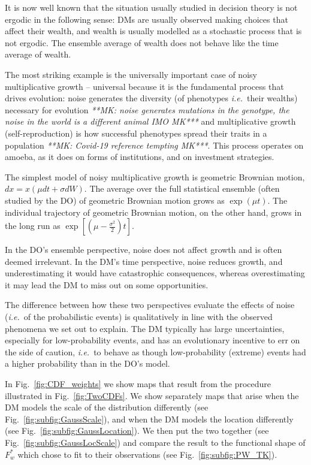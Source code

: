 \documentclass[a4paper, 12pt]{article}
\newcommand{\fref}[1]{Fig.~\ref{fig:#1}}
\newcommand{\ie}{{\it i.e.}\ }
\newcommand{\MK}[1]{{\it ***MK: #1 MK***}}
\begin{document}
It is now well known that the situation usually studied in decision theory is not ergodic in the following sense: DMs are usually observed making choices that affect their wealth, and wealth is usually modelled as a stochastic process that is not ergodic. The ensemble average of wealth does not behave like the time average of wealth.

The most striking example is the universally important case of noisy multiplicative growth -- universal because it is the fundamental process that drives evolution: noise generates the diversity (of phenotypes \ie their wealths) necessary for evolution \MK{noise generates mutations in the genotype, the noise in the world is a different animal IMO} and multiplicative growth (self-reproduction) is how successful phenotypes spread their traits in a population \MK{Covid-19 reference tempting}. This process operates on amoeba, as it does on forms of institutions, and on investment strategies.\cite{PetersAdamou2015a}

The simplest model of noisy multiplicative growth is geometric Brownian motion, $dx=x(\mu dt+\sigma dW)$. The average over the full statistical ensemble (often studied by the DO) of geometric Brownian motion grows as $\exp(\mu t)$. The individual trajectory of geometric Brownian motion, on the other hand, grows in the long run as $\exp[(\mu-\frac{\sigma^2}{2})t]$.

In the DO's ensemble perspective, noise does not affect growth and is often deemed irrelevant. In the DM's time perspective, noise reduces growth, and underestimating it would have catastrophic consequences, whereas overestimating it may lead the DM to miss out on some opportunities.

The difference between how these two perspectives evaluate the effects of noise (\ie of the probabilistic events) is qualitatively in line with the observed phenomena we set out to explain. The DM typically has large uncertainties, especially for low-probability events, and has an evolutionary incentive to err on the side of caution, \ie to behave as though low-probability (extreme) events had a higher probability than in the DO's model.

In \fref{CDF_weights} we show maps that result from the procedure illustrated in \fref{TwoCDFs}. We show separately maps that arise when the DM models the scale of the distribution differently (see \fref{subfig:GaussScale}), and when the DM models the location differently (see \fref{subfig:GaussLocation}). We then put the two together (see \fref{subfig:GaussLocScale}) and compare the result to the functional shape of $F^*_w$ which \cite{TverskyKahneman1992} chose to fit to their observations (see \fref{subfig:PW_TK}).
\end{document}
